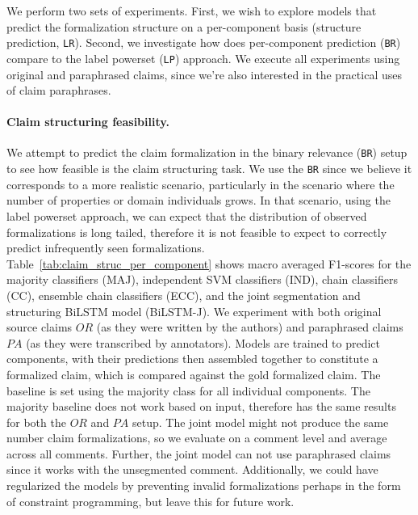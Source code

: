 We perform two sets of experiments. First, we wish to explore models
that predict the formalization structure on a per-component basis (structure
prediction, \texttt{LR}). 
Second, we investigate how does per-component prediction (\texttt{BR}) compare to 
the label powerset (\texttt{LP}) approach.
We execute all experiments using original and paraphrased claims, since we're
also interested in the practical uses of claim paraphrases.

\paragraph{Claim structuring feasibility. }
We attempt to predict the claim formalization in the binary
relevance (\texttt{BR}) setup to see how feasible is the claim 
structuring task. We use the \texttt{BR} since we believe it corresponds
to a more realistic scenario, particularly in the scenario where the number
of properties or domain individuals grows. In that scenario, using the
label powerset approach, we can expect that the
distribution of observed formalizations is long tailed, therefore it is not
feasible to expect to correctly predict infrequently seen formalizations.
Table~\ref{tab:claim_struc_per_component} shows macro averaged F1-scores for
the majority classifiers (MAJ), independent SVM classifiers (IND), chain
classifiers (CC), ensemble chain classifiers (ECC), and the joint segmentation
and structuring BiLSTM model (BiLSTM-J). We experiment with both original
source claims $OR$ (as they were written by the authors) and paraphrased claims $PA$ (as
they were transcribed by annotators).
Models are trained to predict components, with their predictions then assembled
together to constitute a formalized claim, which is compared against the gold
formalized claim.  The baseline is set using the majority 
class for all individual components. The majority baseline does not work 
based on input, therefore has the same results for both the $OR$ and $PA$ setup. 
The joint model might not produce the same number claim formalizations, 
so we evaluate on a comment level and average across all comments. Further, the joint
model can not use paraphrased claims since it works with the unsegmented comment. 
Additionally, we could have regularized the models by preventing invalid
formalizations perhaps in the form of constraint programming, but leave this
for future work. 

